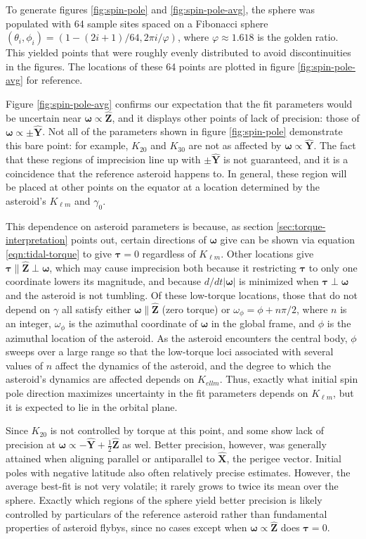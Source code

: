 \documentclass{aastex631}
\newcommand{\unit}[1]{\hat{\bm{#1}}}
\begin{document}
To generate figures \ref{fig:spin-pole} and \ref{fig:spin-pole-avg}, the sphere was populated with 64 sample sites spaced on a Fibonacci sphere $(\theta_i, \phi_i) = (1-(2i + 1) / 64, 2\pi  i/\varphi)$, where $\varphi\approx 1.618$ is the golden ratio. This yielded points that were roughly evenly distributed to avoid discontinuities in the figures. The locations of these 64 points are plotted in figure \ref{fig:spin-pole-avg} for reference.

Figure \ref{fig:spin-pole-avg} confirms our expectation that the fit parameters would be uncertain near $\bm \omega \propto \unit Z$, and it displays other points of lack of precision: those of $\bm \omega \propto \pm \unit Y$. Not all of the parameters shown in figure \ref{fig:spin-pole} demonstrate this bare point: for example, $K_{20}$ and $K_{30}$ are not as affected by $\bm \omega \propto \unit Y$. The fact that these regions of imprecision line up with $\pm \unit Y$ is not guaranteed, and it is a coincidence that the reference asteroid happens to. In general, these region will be placed at other points on the equator at a location determined by the asteroid's $K_{\ell m}$ and $\gamma_0$.

This dependence on asteroid parameters is because, as section \ref{sec:torque-interpretation} points out, certain directions of $\bm \omega$ give can be shown via equation \ref{eqn:tidal-torque} to give $\bm \tau = 0$ regardless of $K_{\ell m}$. Other locations give $\bm \tau \parallel \unit Z \perp \bm \omega$, which may cause imprecision both because it restricting $\bm \tau$ to only one coordinate lowers its magnitude, and because $d/dt |\bm \omega|$ is minimized when $\bm \tau \perp \bm \omega$ and the asteroid is not tumbling. Of these low-torque locations, those that do not depend on $\gamma$ all satisfy either $\bm \omega \parallel \unit Z$ (zero torque) or $\omega_\phi = \phi + n\pi/2$, where $n$ is an integer, $\omega_\phi$ is the azimuthal coordinate of $\bm \omega$ in the global frame, and $\phi$ is the azimuthal location of the asteroid. As the asteroid encounters the central body, $\phi$ sweeps over a large range so that the low-torque loci associated with several values of $n$ affect the dynamics of the asteroid, and the degree to which the asteroid's dynamics are affected depends on $K_{ell m}$. Thus, exactly what initial spin pole direction maximizes uncertainty in the fit parameters depends on $K_{\ell m}$, but it is expected to lie in the orbital plane.

Since $K_{20}$ is not controlled by torque at this point,  and some show lack of precision at $\bm \omega \propto -\unit Y+ \frac{1}{2}\unit Z$ as wel. Better precision, however, was generally attained when aligning parallel or antiparallel to $\unit X$, the perigee vector. Initial poles with negative latitude also often relatively precise estimates. However, the average best-fit is not very volatile; it rarely grows to twice its mean over the sphere. Exactly which regions of the sphere yield better precision is likely controlled by particulars of the reference asteroid rather than fundamental properties of asteroid flybys, since no cases except when $\bm \omega \propto \unit Z$ does $\bm \tau = 0$.
\end{document}
